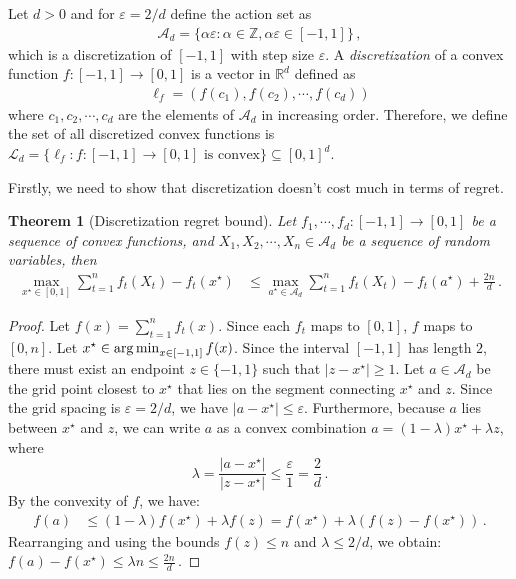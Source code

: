 \documentclass{article}
\theoremstyle{plain}
\newtheorem{theorem}{Theorem}
\theoremstyle{definition}
\renewcommand{\epsilon}{\varepsilon}
\newcommand{\R}{\mathbb R}
\newcommand{\argmin}{\operatornamewithlimits{arg\,min}}
\newcommand{\cL}{\mathcal L}
\newcommand{\cA}{\mathcal A}
\begin{document}
Let $d > 0$ and for $\varepsilon = 2/d$ define the action set as
\begin{align*}
    \cA_d = \{\alpha \epsilon : \alpha \in \mathbb{Z}, \alpha \epsilon \in [-1,1]\}\,,
\end{align*}
which is a discretization of $[-1,1]$ with step size $\epsilon$.
A \emph{discretization} of a convex function $f: [-1,1] \to [0,1]$
is a vector in $\R^d$ defined as
\begin{align*}
    \ell_f = (f(c_1), f(c_2), \cdots, f(c_d))
\end{align*}
where $c_1, c_2, \cdots, c_d$ are the elements of $\cA_d$ in increasing order.
Therefore, we define the set of all discretized convex functions is
$ \cL_d = \{\ell_f : f: [-1,1] \to [0,1] \text{ is convex}\} \subseteq [0,1]^d$.

Firstly, we need to show that discretization doesn't cost much
in terms of regret.
\begin{theorem}[Discretization regret bound]
    \label{thm:discretization-regret-bound}
    Let $f_1, \cdots, f_d : [-1,1] \to [0,1]$ be a sequence of convex functions,
    and $X_1, X_2, \cdots, X_n \in \cA_d$ be a sequence of random variables,
    then
    \begin{align*}
        \max_{x^\star \in [0,1]}
        \sum_{t=1}^{n}
        f_t(X_t) - f_t(x^\star)
         & \leq
        \max_{a^\star \in \cA_d}
        \sum_{t=1}^{n}
        f_t(X_t) - f_t(a^\star)
        +  \frac{2n}{d}\,.
    \end{align*}
\end{theorem}
\begin{proof}
    Let $f(x) = \sum_{t=1}^n f_t(x)$. Since each $f_t$ maps to $[0,1]$, $f$ maps to $[0,n]$.
    Let $x^\star \in \argmin_{x \in [-1,1]} f(x)$.
    Since the interval $[-1, 1]$ has length $2$, there must exist an endpoint $z \in \{-1, 1\}$ such that $|z - x^\star| \ge 1$.
    Let $a \in \cA_d$ be the grid point closest to $x^\star$ that lies on the segment connecting $x^\star$ and $z$.
    Since the grid spacing is $\epsilon = 2/d$, we have $|a - x^\star| \le \epsilon$.
    Furthermore, because $a$ lies between $x^\star$ and $z$, we can write $a$ as a convex combination $a = (1-\lambda)x^\star + \lambda z$, where
    \[
        \lambda = \frac{|a - x^\star|}{|z - x^\star|} \le \frac{\epsilon}{1} = \frac{2}{d}\,.
    \]
    By the convexity of $f$, we have:
    \begin{align*}
        f(a) & \le (1-\lambda)f(x^\star) + \lambda f(z) = f(x^\star) + \lambda (f(z) - f(x^\star))\,.
    \end{align*}
    Rearranging and using the bounds $f(z) \le n$ and $\lambda \le 2/d$, we obtain:
    $
        f(a) - f(x^\star) \le \lambda n \le \frac{2n}{d}\,.
    $
\end{proof}
\end{document}
